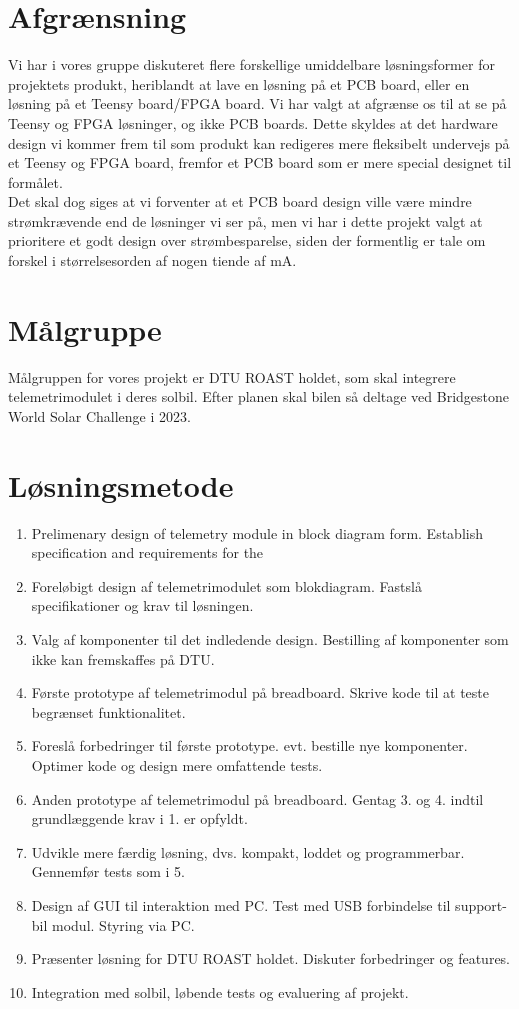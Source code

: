 \documentclass[]{article}
\begin{document}
\section{Afgrænsning}
Vi har i vores gruppe diskuteret flere forskellige umiddelbare løsningsformer for projektets produkt, heriblandt at lave en løsning på et PCB board, eller en løsning på et Teensy board/FPGA board. Vi har valgt at afgrænse os til at se på Teensy og FPGA løsninger, og ikke PCB boards. Dette skyldes at det hardware design vi kommer frem til som produkt kan redigeres mere fleksibelt undervejs på et Teensy og FPGA board, fremfor et PCB board som er mere special designet til formålet.\\
Det skal dog siges at vi forventer at et PCB board design ville være mindre strømkrævende end de løsninger vi ser på, men vi har i dette projekt valgt at prioritere et godt design over strømbesparelse, siden der formentlig er tale om forskel i størrelsesorden af nogen tiende af mA.
\section{Målgruppe}
Målgruppen for vores projekt er DTU ROAST holdet, som skal integrere telemetrimodulet i deres solbil. Efter planen skal bilen så deltage ved Bridgestone World Solar Challenge i 2023.
\section{Løsningsmetode}
\begin{enumerate}
    \item Prelimenary design of telemetry module in block diagram form. Establish specification and requirements for the 
    \item Foreløbigt design af telemetrimodulet som blokdiagram. Fastslå specifikationer og krav til løsningen. 
    \item Valg af komponenter til det indledende design. Bestilling af komponenter som ikke kan fremskaffes på DTU. 
    \item Første prototype af telemetrimodul på breadboard. Skrive kode til at teste begrænset funktionalitet. 
    \item Foreslå forbedringer til første prototype. evt. bestille nye komponenter. Optimer kode og design mere omfattende tests.
    \item Anden prototype af telemetrimodul på breadboard. Gentag 3. og 4. indtil grundlæggende krav i 1. er opfyldt. 
    \item Udvikle mere færdig løsning, dvs. kompakt, loddet og programmerbar. Gennemfør tests som i 5. 
    \item Design af GUI til interaktion med PC. Test med USB forbindelse til support-bil modul. Styring via PC.  
    \item Præsenter løsning for DTU ROAST holdet. Diskuter forbedringer og features. 
    \item Integration med solbil, løbende tests og evaluering af projekt. 
\end{enumerate}
\end{document}
